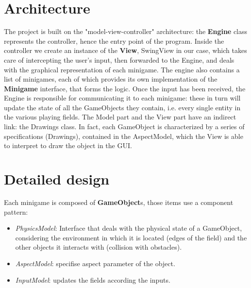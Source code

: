 \documentclass[a4paper,12pt]{report}
\begin{document}
\section{Architecture}
The project is built on the "model-view-controller" architecture: the \textbf{Engine} class represents the controller, hence the entry point of the program.
Inside the controller we create an instance of the \textbf{View}, SwingView in our case, which takes care of intercepting the user's input, then forwarded to the Engine,
and deals with the graphical representation of each minigame. The engine also contains a list of minigames, each of which provides its own implementation of the \textbf{Minigame} interface, that forms the logic.
Once the input has been received, the Engine is responsible for communicating it to each minigame: these in turn will update the state of all the GameObjects they contain, i.e. every single entity in the various playing fields.
The Model part and the View part have an indirect link: the Drawings class. In fact, each GameObject is characterized by a series of specifications (Drawings), contained in the AspectModel, which the View is able to interpret 
to draw the object in the GUI.



%
\section{Detailed design}
Each minigame is composed of \textbf{GameObject}s, those items use a component pattern:
\begin{itemize}
	\item \textit{PhysicsModel}: Interface that deals with the physical state of a GameObject, 
	considering the environment in which it is located (edges of the field) and the 
	other objects it interacts with (collision with obstacles).
	\item \textit{AspectModel}: specifise aspect parameter of the object.
	\item \textit{InputModel}: updates the fields according the inputs.
\end{itemize}
\end{document}

